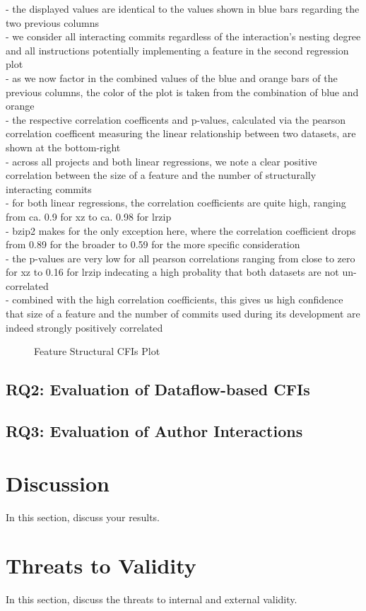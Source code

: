 - the displayed values are identical to the values shown in blue bars regarding the two previous columns \\
- we consider all interacting commits regardless of the interaction's nesting degree and all instructions potentially implementing a feature in the second regression plot \\
- as we now factor in the combined values of the blue and orange bars of the previous columns, the color of the plot is taken from the combination of blue and orange \\
- the respective correlation coefficents and p-values, calculated via the pearson correlation coefficent measuring the linear relationship between two datasets, are shown at the bottom-right \\
- across all projects and both linear regressions, we note a clear positive correlation between the size of a feature and the number of structurally interacting commits \\
- for both linear regressions, the correlation coefficients are quite high, ranging from ca. 0.9 for xz to ca. 0.98 for lrzip \\
- bzip2 makes for the only exception here, where the correlation coefficient drops from 0.89 for the broader to 0.59 for the more specific consideration \\
- the p-values are very low for all pearson correlations ranging from close to zero for xz to 0.16 for lrzip indecating a high probality that both datasets are not un-correlated \\
- combined with the high correlation coefficients, this gives us high confidence that size of a feature and the number of commits used during its development are indeed strongly positively correlated 

\begin{figure}[htbp]
  \centering
  
  \caption{Feature Structural CFIs Plot}
  \label{fig:feature_sfbr_plot}
\end{figure}

\subsection*{\textbf{RQ2: Evaluation of Dataflow-based CFIs}}\label{sec:eval_df_cfis}

\subsection*{\textbf{RQ3: Evaluation of Author Interactions}}\label{sec:eval_author_interactions}

\section{Discussion}\label{sec:discussion}

In this section, discuss your results.

\section{Threats to Validity}\label{sec:threats}

In this section, discuss the threats to internal and external validity.
